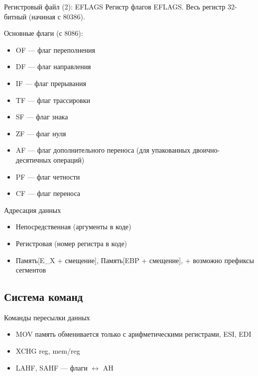 \documentclass[xetex,aspectratio=43]{beamer}
\begin{document}
\begin{frame}{Регистровый файл (2): EFLAGS}
Регистр флагов EFLAGS.
    Весь регистр 32-битный (начиная с 80386).

    Основные флаги (с 8086):

    \begin{itemize}
        \tightlist
        \item
        OF --- флаг переполнения
        \item
        DF --- флаг направления
        \item
        IF --- флаг прерывания
        \item
        TF --- флаг трассировки
        \item
        SF --- флаг знака
        \item
        ZF --- флаг нуля
        \item
        AF --- флаг дополнительного переноса (для упакованных
        двоично-десятичных операций)
        \item
        PF --- флаг четности
        \item
        CF --- флаг переноса
    \end{itemize}
\end{frame}

\begin{frame}{Адресация данных}
    \begin{itemize}
        \item
        Непосредственная (аргументы в коде)
        \item
        Регистровая (номер регистра в коде)
        \item
        Память{[}E\_X + смещение{]}, Память{[}EBP + смещение{]}, + возможно
        префиксы сегментов
    \end{itemize}
\end{frame}

\subsection{Система команд}

\begin{frame}{Команды пересылки данных}
    \begin{itemize}
        \tightlist
        \item
        MOV память обменивается только с арифметическими регистрами, ESI, EDI
        \item
        XCHG reg, mem/reg
        \item
        LAHF, SAHF --- флаги \(\leftrightarrow\) AH
    \end{itemize}
\end{frame}
\end{document}
